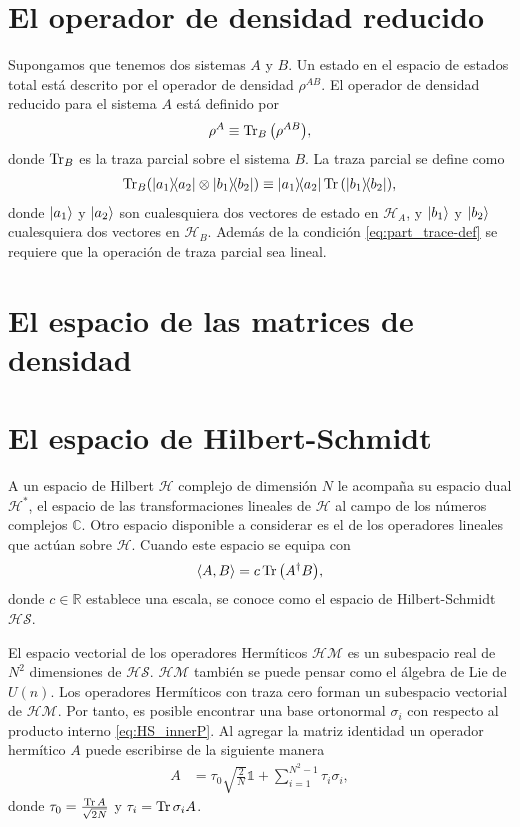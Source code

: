 \section{El operador de densidad reducido} %
Supongamos que tenemos dos sistemas $A$ y $B$. Un estado en el espacio de 
estados total está descrito por el operador de densidad $\rho^{AB}$. El
operador de densidad reducido para el sistema $A$ está definido por
\begin{align}
	\rho^A \equiv \Tr _B\qty(\rho^{AB}),
\end{align}
donde $\Tr_B$ es la traza parcial sobre el sistema $B$. La traza parcial
se define como 
\begin{align}
	\Tr_B (\dyad{a_1}{a_2}\otimes \dyad{b_1}{b_2})
	\equiv
	\dyad{a_1}{a_2}\Tr \qty(\dyad{b_1}{b_2}),
	\label{eq:part_trace-def}
\end{align}
donde $\ket{a_1}$ y $\ket{a_2}$ son cualesquiera dos vectores de estado en
$\mathcal{H}_A$, y $\ket{b_1}$ y $\ket{b_2}$ cualesquiera dos vectores
en $\mathcal{H}_B$. Además de la condición \eqref{eq:part_trace-def} se
requiere que la operación de traza parcial sea lineal.
\section{El espacio de las matrices de densidad}  %
\section{El espacio de Hilbert-Schmidt} %
A un espacio de Hilbert $\mathcal{H}$ complejo de dimensión $N$
le acompaña su espacio dual $\mathcal{H}^*$,
el espacio de las transformaciones lineales de $\mathcal{H}$
al campo de los números complejos $\mathbb{C}$. Otro espacio disponible 
a considerar es el de los operadores lineales que actúan sobre $\mathcal{H}$. 
Cuando este espacio se equipa con 
\begin{equation}
\langle A,B\rangle=c\Tr \qty(A^{\dagger}B),
\label{eq:HS_innerP}
\end{equation}
donde $c\in \mathbb{R}$ establece una escala, se conoce como el espacio de
Hilbert-Schmidt $\mathcal{HS}$. 

El espacio vectorial de los operadores Hermíticos 
$\mathcal{HM}$ es un subespacio real de $N^2$ dimensiones de $\mathcal{HS}$. 
$\mathcal{HM}$ también se puede pensar como el álgebra de Lie de $U(n)$. Los
operadores Hermíticos con traza cero forman un subespacio vectorial de
$\mathcal{HM}$. Por tanto, es posible encontrar una base ortonormal
$\sigma_i$ con
respecto al producto interno \eqref{eq:HS_innerP}. Al agregar la 
matriz identidad un operador hermítico $A$ puede escribirse de la siguiente
manera
\begin{align}
	A &= \tau_0\sqrt{\frac{2}{N}}\mathbb{1} + \sum _{i=1}^{N^2-1}\tau_i\sigma_i,
\end{align}
donde $\tau_0=\frac{\Tr A}{\sqrt{2N}}$ y $\tau_i=\Tr \sigma _iA$.
 
